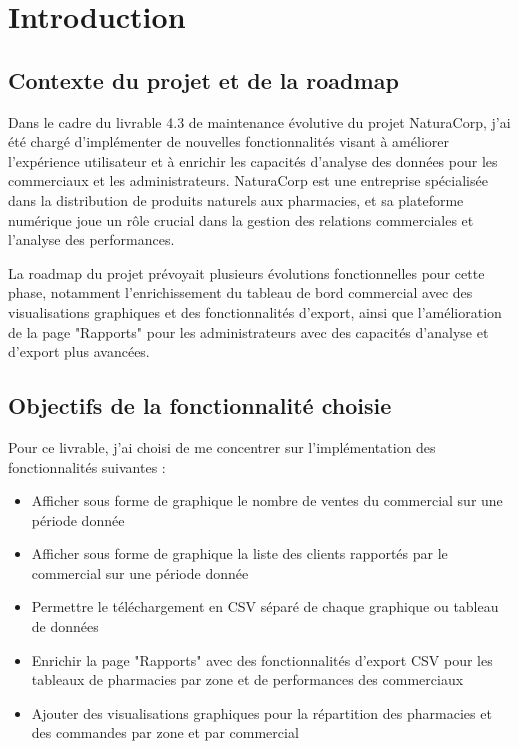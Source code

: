 \documentclass[a4paper,12pt]{report}
\begin{document}
\newpage
\renewcommand{\contentsname}{Sommaire}
\tableofcontents
\newpage

\section{Introduction}
  \subsection{Contexte du projet et de la roadmap}
  Dans le cadre du livrable 4.3 de maintenance évolutive du projet NaturaCorp, j'ai été chargé d'implémenter de nouvelles fonctionnalités visant à améliorer l'expérience utilisateur et à enrichir les capacités d'analyse des données pour les commerciaux et les administrateurs. NaturaCorp est une entreprise spécialisée dans la distribution de produits naturels aux pharmacies, et sa plateforme numérique joue un rôle crucial dans la gestion des relations commerciales et l'analyse des performances.

  La roadmap du projet prévoyait plusieurs évolutions fonctionnelles pour cette phase, notamment l'enrichissement du tableau de bord commercial avec des visualisations graphiques et des fonctionnalités d'export, ainsi que l'amélioration de la page "Rapports" pour les administrateurs avec des capacités d'analyse et d'export plus avancées.

  \subsection{Objectifs de la fonctionnalité choisie}
  Pour ce livrable, j'ai choisi de me concentrer sur l'implémentation des fonctionnalités suivantes :
  
  \begin{itemize}
    \item Afficher sous forme de graphique le nombre de ventes du commercial sur une période donnée
    \item Afficher sous forme de graphique la liste des clients rapportés par le commercial sur une période donnée
    \item Permettre le téléchargement en CSV séparé de chaque graphique ou tableau de données
    \item Enrichir la page "Rapports" avec des fonctionnalités d'export CSV pour les tableaux de pharmacies par zone et de performances des commerciaux
    \item Ajouter des visualisations graphiques pour la répartition des pharmacies et des commandes par zone et par commercial
  \end{itemize}
  
\end{document}
